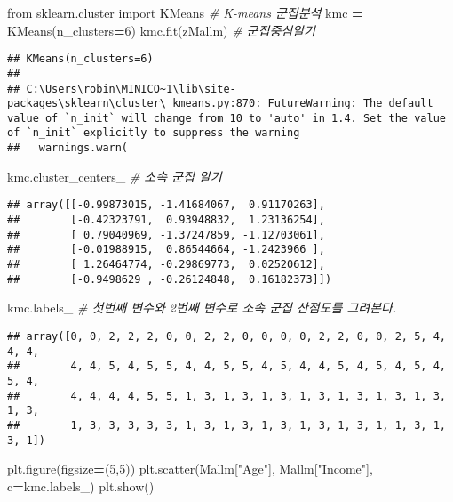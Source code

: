 \documentclass[
]{article}
\newenvironment{Shaded}{\begin{snugshade}}{\end{snugshade}}
\newcommand{\CommentTok}[1]{\textcolor[rgb]{0.56,0.35,0.01}{\textit{#1}}}
\newcommand{\DecValTok}[1]{\textcolor[rgb]{0.00,0.00,0.81}{#1}}
\newcommand{\ImportTok}[1]{#1}
\newcommand{\NormalTok}[1]{#1}
\newcommand{\OperatorTok}[1]{\textcolor[rgb]{0.81,0.36,0.00}{\textbf{#1}}}
\newcommand{\StringTok}[1]{\textcolor[rgb]{0.31,0.60,0.02}{#1}}
\begin{document}
\begin{Shaded}
\begin{Highlighting}[]
\ImportTok{from}\NormalTok{ sklearn.cluster }\ImportTok{import}\NormalTok{ KMeans}
\CommentTok{\# K{-}means 군집분석}
\NormalTok{kmc }\OperatorTok{=}\NormalTok{ KMeans(n\_clusters}\OperatorTok{=}\DecValTok{6}\NormalTok{)}
\NormalTok{kmc.fit(zMallm)}
\CommentTok{\# 군집중심알기}
\end{Highlighting}
\end{Shaded}

\begin{verbatim}
## KMeans(n_clusters=6)
## 
## C:\Users\robin\MINICO~1\lib\site-packages\sklearn\cluster\_kmeans.py:870: FutureWarning: The default value of `n_init` will change from 10 to 'auto' in 1.4. Set the value of `n_init` explicitly to suppress the warning
##   warnings.warn(
\end{verbatim}

\begin{Shaded}
\begin{Highlighting}[]
\NormalTok{kmc.cluster\_centers\_}
\CommentTok{\# 소속 군집 알기}
\end{Highlighting}
\end{Shaded}

\begin{verbatim}
## array([[-0.99873015, -1.41684067,  0.91170263],
##        [-0.42323791,  0.93948832,  1.23136254],
##        [ 0.79040969, -1.37247859, -1.12703061],
##        [-0.01988915,  0.86544664, -1.2423966 ],
##        [ 1.26464774, -0.29869773,  0.02520612],
##        [-0.9498629 , -0.26124848,  0.16182373]])
\end{verbatim}

\begin{Shaded}
\begin{Highlighting}[]
\NormalTok{kmc.labels\_}
\CommentTok{\# 첫번째 변수와 2번째 변수로 소속 군집 산점도를 그려본다.}
\end{Highlighting}
\end{Shaded}

\begin{verbatim}
## array([0, 0, 2, 2, 2, 0, 0, 2, 2, 0, 0, 0, 0, 2, 2, 0, 0, 2, 5, 4, 4, 4,
##        4, 4, 5, 4, 5, 5, 4, 4, 5, 5, 4, 5, 4, 4, 5, 4, 5, 4, 5, 4, 5, 4,
##        4, 4, 4, 4, 5, 5, 1, 3, 1, 3, 1, 3, 1, 3, 1, 3, 1, 3, 1, 3, 1, 3,
##        1, 3, 3, 3, 3, 3, 1, 3, 1, 3, 1, 3, 1, 3, 1, 3, 1, 1, 3, 1, 3, 1])
\end{verbatim}

\begin{Shaded}
\begin{Highlighting}[]
\NormalTok{plt.figure(figsize}\OperatorTok{=}\NormalTok{(}\DecValTok{5}\NormalTok{,}\DecValTok{5}\NormalTok{))}
\NormalTok{plt.scatter(Mallm[}\StringTok{"Age"}\NormalTok{], Mallm[}\StringTok{"Income"}\NormalTok{], c}\OperatorTok{=}\NormalTok{kmc.labels\_)}
\NormalTok{plt.show()}
\end{Highlighting}
\end{Shaded}
\end{document}
